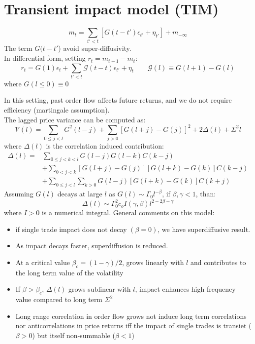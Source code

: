 \section{Transient impact model (TIM)}
\begin{mydefinition}
\begin{equation}
	m_t = \sum_{t'<t} [G(t-t')\epsilon_{t'} + \eta_{t'}] + m_{-\infty}
\end{equation}
The term $G(t-t'$) avoid super-diffusivity.\\
In differential form, setting $r_t = m_{t+1}-m_t$:
\begin{equation}
	r_t = G(1)\epsilon_t + \sum_{t'<t} \mathcal{G} (t-t)\epsilon_{t'} + \eta_t \qquad \mathcal{G}(l) \equiv G(l+1)-G(l)
\end{equation}
where $G(l\leq 0) \equiv 0$
\end{mydefinition}
In this setting, past order flow affects future returns, and we do not require efficiency (martingale assumption).\\
The lagged price variance can be computed as:
\[
\mathcal{V}(l) = \sum_{0\leq j <l} G^2(l-j) + \sum_{j>0} [ G(l+j) - G(j)]^2 + 2 \Delta(l) + \Sigma^2l
\]
where $\Delta(l)$ is the correlation induced contribution:
\begin{align*}
	\Delta(l) = & \sum_{0\leq j < k <l} G(l-j)G(l-k)C(k-j)\\
	& + \sum_{0<j<k} [G(l+j) - G(j)][G(l+k) -G(k)]C(k-j) \\
	& + \sum_{0\leq j <l}\sum_{k>0} G(l-j) [G(l+k) - G(k)]C(k+j)
\end{align*}
Assuming $G(l)$ decays at large $l$  as $G(l)\sim \Gamma_0l^{-\beta}$, if $\beta,\gamma <1$, than:
\[
\Delta(l) \sim \Gamma_0^2c_oI(\gamma,\beta)l^{2-2\beta-\gamma}
\]
where $I>0$ is a numerical integral.
General comments on this model:
\begin{itemize}
	\item if single trade impact does not decay $(\beta = 0)$, we have superdiffusive result.
	\item As impact decays faster, superdiffusion is reduced.
	\item At a critical value $\beta_c  = (1-\gamma)/2$, grows linearly with $l$ and contributes to the long term value of the volatility
	\item If $\beta > \beta_c$, $\Delta(l)$ grows sublinear with $l$, impact enhances high frequency value compared to long term $\Sigma^2$
	\item Long range correlation in order flow grows not induce long term correlations nor anticorrelations in price returns iff the impact of single trades is transiet ($\beta >0$) but itself non-summable ($\beta <1$)
\end{itemize}
